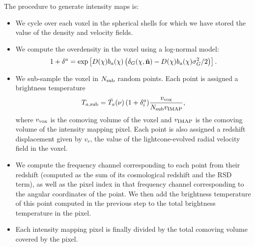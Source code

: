 \documentclass[a4paper,10pt]{article}
\begin{document}
  The procedure to generate intensity maps is:
  \begin{itemize}
    \item We cycle over each voxel in the spherical shells for which we have stored
      the value of the density and velocity fields.
    \item We compute the overdensity in the voxel using a log-normal model:
      \begin{equation}
        1+\delta^a=
        \exp\left[D(\chi)b_a(\chi)\left(\delta_G(\chi,\hat{\bf n})-
          D(\chi)b_a(\chi)\sigma_G^2/2\right)\right].
      \end{equation}
    \item We sub-sample the voxel in $N_{\rm sub}$ random points. Each point is
      assigned a brightness temperature
      \begin{equation}
        T_{a,{\rm sub}}=\bar{T_a}(\nu)\,(1+\delta^a_i)\frac{v_{\rm vox}}{N_{\rm sub}v_{\rm IMAP}},
      \end{equation}
      where $v_{\rm vox}$ is the comoving volume of the voxel and $v_{\rm IMAP}$ is the
      comoving volume of the intensity mapping pixel. Each point is also assigned a redshift
      displacement given by $v_r$, the value of the lightcone-evolved radial velocity
      field in the voxel.
    \item We compute the frequency channel corresponding to each point from their
      redshift (computed as the sum of its cosmological redshift and the RSD term),
      as well as the pixel index in that frequency channel corresponding to the
      angular coordinates of the point. We then add the brightness temperature of
      this point computed in the previous step to the total brightness temperature
      in the pixel.
    \item Each intensity mapping pixel is finally divided by the total comoving
      volume covered by the pixel.
  \end{itemize}
  
\end{document}
